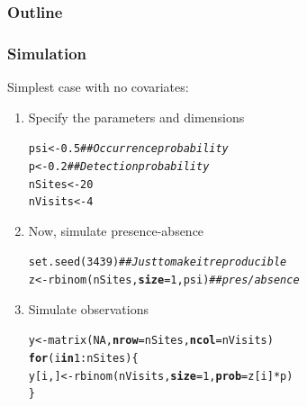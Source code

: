 \documentclass[color=usenames,dvipsnames]{beamer}\usepackage[]{graphicx}\usepackage[]{xcolor}
\makeatletter
\newcommand{\hlnum}[1]{\textcolor[rgb]{0.69,0.494,0}{#1}}%
\newcommand{\hlcom}[1]{\textcolor[rgb]{0.514,0.506,0.514}{\textit{#1}}}%
\newcommand{\hlopt}[1]{\textcolor[rgb]{0,0,0}{#1}}%
\newcommand{\hldef}[1]{\textcolor[rgb]{0,0,0}{#1}}%
\newcommand{\hlkwa}[1]{\textcolor[rgb]{0,0,0}{\textbf{#1}}}%
\newcommand{\hlkwb}[1]{\textcolor[rgb]{0,0.341,0.682}{#1}}%
\newcommand{\hlkwc}[1]{\textcolor[rgb]{0,0,0}{\textbf{#1}}}%
\newcommand{\hlkwd}[1]{\textcolor[rgb]{0.004,0.004,0.506}{#1}}%
\newenvironment{kframe}{%
 \def\at@end@of@kframe{}%
 \ifinner\ifhmode%
  \def\at@end@of@kframe{\end{minipage}}%
  \begin{minipage}{\columnwidth}%
 \fi\fi%
 \def\FrameCommand##1{\hskip\@totalleftmargin \hskip-\fboxsep
 \colorbox{shadecolor}{##1}\hskip-\fboxsep
     \hskip-\linewidth \hskip-\@totalleftmargin \hskip\columnwidth}%
 \MakeFramed {\advance\hsize-\width
   \@totalleftmargin\z@ \linewidth\hsize
   \@setminipage}}%
 {\par\unskip\endMakeFramed%
 \at@end@of@kframe}
\newenvironment{knitrout}{}{} %
\makeatother
\begin{document}
\begin{frame}
  \frametitle{Outline}
  \Large
  \tableofcontents[currentsection]
\end{frame}


\begin{frame}[fragile]
  \frametitle{Simulation}
  Simplest case with no covariates: \\
  \vfill
  \begin{enumerate}[<+->]
  \item Specify the parameters and dimensions
\begin{knitrout}\footnotesize
{}\color{fgcolor}\begin{kframe}
\begin{alltt}
\hldef{psi} \hlkwb{<-} \hlnum{0.5}       \hlcom{## Occurrence probability}
\hldef{p} \hlkwb{<-} \hlnum{0.2}         \hlcom{## Detection probability}
\hldef{nSites} \hlkwb{<-} \hlnum{20}
\hldef{nVisits} \hlkwb{<-} \hlnum{4}
\end{alltt}
\end{kframe}
\end{knitrout}
  \item Now, simulate presence-absence
\begin{knitrout}\footnotesize
{}\color{fgcolor}\begin{kframe}
\begin{alltt}
\hlkwd{set.seed}\hldef{(}\hlnum{3439}\hldef{)}    \hlcom{## Just to make it reproducible}
\hldef{z} \hlkwb{<-} \hlkwd{rbinom}\hldef{(nSites,} \hlkwc{size}\hldef{=}\hlnum{1}\hldef{, psi)} \hlcom{## pres/absence}
\end{alltt}
\end{kframe}
\end{knitrout}
  \item Simulate observations
\begin{knitrout}\footnotesize
{}\color{fgcolor}\begin{kframe}
\begin{alltt}
\hldef{y} \hlkwb{<-} \hlkwd{matrix}\hldef{(}\hlnum{NA}\hldef{,} \hlkwc{nrow}\hldef{=nSites,} \hlkwc{ncol}\hldef{=nVisits)}
\hlkwa{for}\hldef{(i} \hlkwa{in} \hlnum{1}\hlopt{:}\hldef{nSites) \{}
    \hldef{y[i,]} \hlkwb{<-} \hlkwd{rbinom}\hldef{(nVisits,} \hlkwc{size}\hldef{=}\hlnum{1}\hldef{,} \hlkwc{prob}\hldef{=z[i]}\hlopt{*}\hldef{p)}
\hldef{\}}
\end{alltt}
\end{kframe}
\end{knitrout}
\end{enumerate}
\end{frame}
\end{document}
